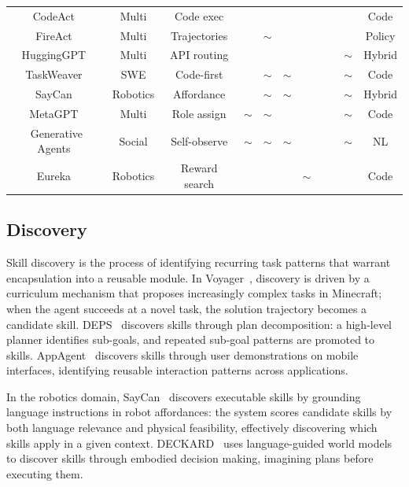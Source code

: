 \documentclass[conference, compsoc]{IEEEtran}
\theoremstyle{plain}
\newcommand{\cmark}{\ding{51}}
\newcommand{\xmark}{\ding{55}}
\newcommand{\pmark}{{\color{orange}$\sim$}}
\begin{document}
\begin{table}[t]
{\begin{tabular}{c|c|c|ccccccc|c}
CodeAct~\cite{wang2024codeact} & Multi & Code exec & \xmark & \xmark & \xmark & \xmark & \xmark & \cmark & \cmark & Code \\
FireAct~\cite{chen2023fireact} & Multi & Trajectories & \xmark & \pmark & \cmark & \xmark & \xmark & \cmark & \cmark & Policy \\
HuggingGPT~\cite{shen2023hugginggpt} & Multi & API routing & \xmark & \xmark & \xmark & \cmark & \cmark & \cmark & \pmark & Hybrid \\
TaskWeaver~\cite{qin2023taskweaver} & SWE & Code-first & \xmark & \pmark & \pmark & \cmark & \cmark & \cmark & \pmark & Code \\
\midrule
SayCan~\cite{ahn2022saycan} & Robotics & Affordance & \cmark & \pmark & \pmark & \cmark & \cmark & \cmark & \pmark & Hybrid \\
MetaGPT~\cite{hong2024metagpt} & Multi & Role assign & \pmark & \pmark & \cmark & \cmark & \cmark & \cmark & \pmark & Code \\
Generative Agents~\cite{park2023generative} & Social & Self-observe & \pmark & \pmark & \pmark & \cmark & \cmark & \cmark & \pmark & NL \\
Eureka~\cite{ma2024eureka} & Robotics & Reward search & \cmark & \cmark & \cmark & \pmark & \xmark & \cmark & \cmark & Code \\
\bottomrule
\end{tabular}%
}
\end{table}

\subsection{Discovery}
\label{sec:lifecycle:discovery}

Skill discovery is the process of identifying recurring task patterns that warrant encapsulation into a reusable module. In Voyager~\cite{wang2023voyager}, discovery is driven by a curriculum mechanism that proposes increasingly complex tasks in Minecraft; when the agent succeeds at a novel task, the solution trajectory becomes a candidate skill. DEPS~\cite{wang2023deps} discovers skills through plan decomposition: a high-level planner identifies sub-goals, and repeated sub-goal patterns are promoted to skills. AppAgent~\cite{zhang2023appagent} discovers skills through user demonstrations on mobile interfaces, identifying reusable interaction patterns across applications.

In the robotics domain, SayCan~\cite{ahn2022saycan} discovers executable skills by grounding language instructions in robot affordances: the system scores candidate skills by both language relevance and physical feasibility, effectively discovering which skills apply in a given context. DECKARD~\cite{nottingham2023deckard} uses language-guided world models to discover skills through embodied decision making, imagining plans before executing them.
\end{document}
